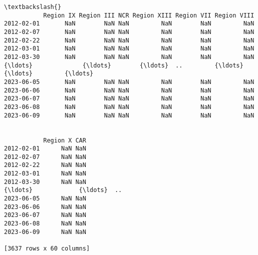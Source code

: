 \documentclass[11pt]{article}
\begin{document}
\begin{tcolorbox}[breakable, size=fbox, boxrule=.5pt, pad at break*=1mm, opacityfill=0]
\begin{Verbatim}[commandchars=\\\{\}]
                                                                        \textbackslash{}
           Region IX Region III NCR Region XIII Region VII Region VIII
2012-02-01       NaN        NaN NaN         NaN        NaN         NaN
2012-02-07       NaN        NaN NaN         NaN        NaN         NaN
2012-02-22       NaN        NaN NaN         NaN        NaN         NaN
2012-03-01       NaN        NaN NaN         NaN        NaN         NaN
2012-03-30       NaN        NaN NaN         NaN        NaN         NaN
{\ldots}              {\ldots}        {\ldots}  ..         {\ldots}        {\ldots}         {\ldots}
2023-06-05       NaN        NaN NaN         NaN        NaN         NaN
2023-06-06       NaN        NaN NaN         NaN        NaN         NaN
2023-06-07       NaN        NaN NaN         NaN        NaN         NaN
2023-06-08       NaN        NaN NaN         NaN        NaN         NaN
2023-06-09       NaN        NaN NaN         NaN        NaN         NaN


           Region X CAR
2012-02-01      NaN NaN
2012-02-07      NaN NaN
2012-02-22      NaN NaN
2012-03-01      NaN NaN
2012-03-30      NaN NaN
{\ldots}             {\ldots}  ..
2023-06-05      NaN NaN
2023-06-06      NaN NaN
2023-06-07      NaN NaN
2023-06-08      NaN NaN
2023-06-09      NaN NaN

[3637 rows x 60 columns]
\end{Verbatim}
\end{tcolorbox}
        
\end{document}

